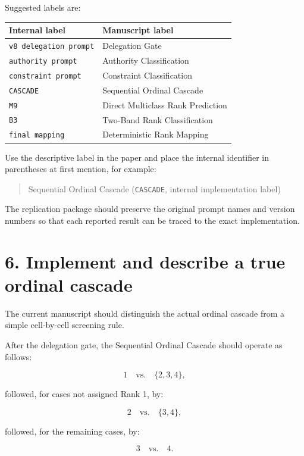 \documentclass[11pt]{article}
\begin{document}
Suggested labels are:

\begin{center}
\small
\begin{tabularx}{\textwidth}{@{}lX@{}}
\toprule
\textbf{Internal label} & \textbf{Manuscript label} \\
\midrule
\texttt{v8 delegation prompt} & Delegation Gate \\
\texttt{authority prompt} & Authority Classification \\
\texttt{constraint prompt} & Constraint Classification \\
\texttt{CASCADE} & Sequential Ordinal Cascade \\
\texttt{M9} & Direct Multiclass Rank Prediction \\
\texttt{B3} & Two-Band Rank Classification \\
\texttt{final mapping} & Deterministic Rank Mapping \\
\bottomrule
\end{tabularx}
\end{center}

Use the descriptive label in the paper and place the internal identifier in parentheses at first mention, for example:

\begin{quote}
Sequential Ordinal Cascade (\texttt{CASCADE}, internal implementation label)
\end{quote}

The replication package should preserve the original prompt names and version numbers so that each reported result can be traced to the exact implementation.

\section*{6. Implement and describe a true ordinal cascade}

The current manuscript should distinguish the actual ordinal cascade from a simple cell-by-cell screening rule.

After the delegation gate, the Sequential Ordinal Cascade should operate as follows:

\[
1 \quad \text{vs.} \quad \{2,3,4\},
\]

followed, for cases not assigned Rank 1, by:

\[
2 \quad \text{vs.} \quad \{3,4\},
\]

followed, for the remaining cases, by:

\[
3 \quad \text{vs.} \quad 4.
\]
\end{document}
